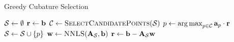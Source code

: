 \begin{algorithm}
\caption{Greedy Cubature Selection}
\begin{algorithmic}[1]
\State $\mathcal{S} \gets \emptyset$
\State $\mathbf{r} \gets \mathbf{b}$
\State $\fancyC \gets \Call{SelectCandidatePoints}{\fancyS}$
\State $p \gets \operatorname*{arg\,max}_{p \in \mathcal{C}} {\mathbf{a}_p \cdot \mathbf{r}}$
\State $\mathcal{S} \gets \mathcal{S} \cup \{p\}$
\State $\ww \gets \Call{NNLS}{\boldA_{\fancyS},\bb}$
\State $\mathbf{r} \gets \mathbf{b} - \mathbf{A}_{\mathcal{S}} \mathbf{w}$
\EndWhile
\Return{$(\fancyS$, $\ww$)}
\EndFunction
\end{algorithmic}
\end{algorithm}
